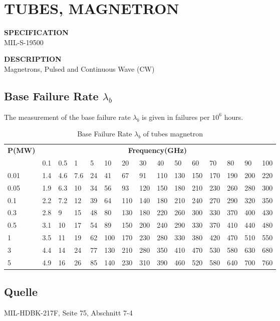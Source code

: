 \section{TUBES, MAGNETRON}

\begin{minipage}[t]{0.28\textwidth}
    \textbf{SPECIFICATION}\\
    MIL-S-19500
\end{minipage}
\begin{minipage}[t]{0.7\textwidth}
    \textbf{DESCRIPTION}\\
    {\fontsize{12pt}{12pt}\selectfont Magnetrons, Pulsed and Continuous Wave (CW)}
\end{minipage}

\subsection{Base Failure Rate $\lambda_b$}
The measurement of the base failure rate $\lambda_b$ is given in failures per $10^6$ hours.
\begin{table}[ht]
{\centering
\begin{tabular}{|p{1.1cm}|*{14}{p{.55cm}|}}
    \hline
    \textbf{P(MW)} & \multicolumn{14}{c|}{\textbf{Frequency(GHz)}} \\
    & 0.1 & 0.5 & 1 & 5 & 10 & 20 & 30 & 40 & 50 & 60 & 70 & 80 & 90 & 100 \\
    \hline
    0.01 & 1.4 & 4.6 & 7.6 & 24 & 41 & 67 & 91 & 110 & 130 & 150 & 170 & 190 & 200 & 220 \\
    \hline
    0.05 & 1.9 & 6.3 & 10 & 34 & 56 & 93 & 120 & 150 & 180 & 210 & 230 & 260 & 280 & 300 \\
    \hline
    0.1 & 2.2 & 7.2 & 12 & 39 & 64 & 110 & 140 & 180 & 210 & 240 & 270 & 290 & 320 & 350 \\
    \hline
    0.3 & 2.8 & 9 & 15 & 48 & 80 & 130 & 180 & 220 & 260 & 300 & 330 & 370 & 400 & 430 \\
    \hline
    0.5 & 3.1 & 10 & 17 & 54 & 89 & 150 & 200 & 240 & 290 & 330 & 370 & 410 & 440 & 480 \\
    \hline
    1 & 3.5 & 11 & 19 & 62 & 100 & 170 & 230 & 280 & 330 & 380 & 420 & 470 & 510 & 550 \\
    \hline
    3 & 4.4 & 14 & 24 & 77 & 130 & 210 & 280 & 350 & 410 & 470 & 530 & 580 & 630 & 680 \\
    \hline
    5 & 4.9 & 16 & 26 & 85 & 140 & 230 & 310 & 390 & 460 & 520 & 580 & 640 & 700 & 760 \\
    \hline
\end{tabular}
\caption{Base Failure Rate $\lambda_b$ of tubes magnetron}
\label{tab:bfr_tubes_magnetron}
\par}
\subsection*{Quelle}
MIL-HDBK-217F, Seite 75, Abschnitt 7-4
\end{table}